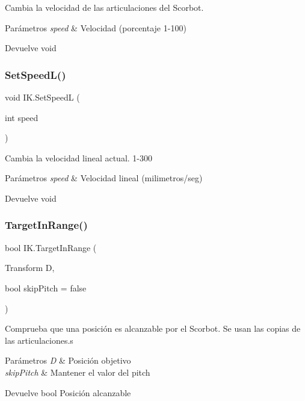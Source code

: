 Cambia la velocidad de las articulaciones del Scorbot. 
\begin{DoxyParams}{Parámetros}
{\em speed} & Velocidad (porcentaje 1-\/100) \\
\hline
\end{DoxyParams}
\begin{DoxyReturn}{Devuelve}
void 
\end{DoxyReturn}
\mbox{\label{class_i_k_afc1472fadfc08f9df7374af09ca83110}} 
\subsubsection{\texorpdfstring{SetSpeedL()}{SetSpeedL()}}
{\footnotesize\ttfamily void I\+K.\+Set\+SpeedL (\begin{DoxyParamCaption}\item[{int}]{speed }\end{DoxyParamCaption})\hspace{0.3cm}{\ttfamily [inline]}}

Cambia la velocidad lineal actual. 1-\/300 
\begin{DoxyParams}{Parámetros}
{\em speed} & Velocidad lineal (milimetros/seg) \\
\hline
\end{DoxyParams}
\begin{DoxyReturn}{Devuelve}
void 
\end{DoxyReturn}
\mbox{\label{class_i_k_ad97122f89dfb2c5bff5605cbcf5c5cc7}} 
\subsubsection{\texorpdfstring{TargetInRange()}{TargetInRange()}}
{\footnotesize\ttfamily bool I\+K.\+Target\+In\+Range (\begin{DoxyParamCaption}\item[{Transform}]{D,  }\item[{bool}]{skip\+Pitch = {\ttfamily false} }\end{DoxyParamCaption})\hspace{0.3cm}{\ttfamily [inline]}}

Comprueba que una posición es alcanzable por el Scorbot. Se usan las copias de las articulaciones.\+s 
\begin{DoxyParams}{Parámetros}
{\em D} & Posición objetivo \\
\hline
{\em skip\+Pitch} & Mantener el valor del pitch \\
\hline
\end{DoxyParams}
\begin{DoxyReturn}{Devuelve}
bool Posición alcanzable 
\end{DoxyReturn}
\mbox{\label{class_i_k_a1bd362c7864cb7e81a09cfc03a9b9151}} 
